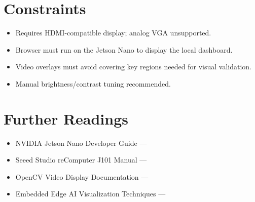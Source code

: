 \section{Constraints}
\begin{itemize}
	\item Requires \ac{HDMI}-compatible display; analog VGA unsupported.  
	\item Browser must run on the Jetson Nano to display the local dashboard.  
	\item Video overlays must avoid covering key regions needed for visual validation.  
	\item Manual brightness/contrast tuning recommended.  
\end{itemize}

\section{Further Readings}
\begin{itemize}
	\item NVIDIA Jetson Nano Developer Guide — \cite{jetson_nano_doc}
	\item Seeed Studio reComputer J101 Manual — \cite{seeedJ101Manual}
	\item OpenCV Video Display Documentation — \cite{opencv_doc_2024}
	\item Embedded Edge \ac{AI} Visualization Techniques — \cite{edgeAIbook}
\end{itemize}
